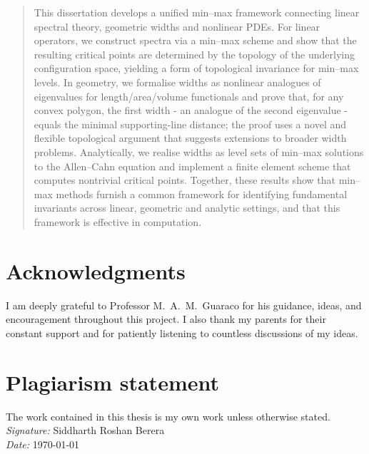 \documentclass[a4paper,11pt, twoside]{report}
\theoremstyle{definition}  %
\newcommand{\reportauthor}{Siddharth Roshan Berera} %
\begin{document}


\begin{abstract}
This dissertation develops a unified min--max framework connecting linear spectral theory, geometric widths and nonlinear PDEs. For linear operators, we construct spectra via a min--max scheme and show that the resulting critical points are determined by the topology of the underlying configuration space, yielding a form of topological invariance for min--max levels. In geometry, we formalise widths as nonlinear analogues of eigenvalues for length/area/volume functionals and prove that, for any convex polygon, the first width - an analogue of the second eigenvalue - equals the minimal supporting-line distance; the proof uses a novel and flexible topological argument that suggests extensions to broader width problems. Analytically, we realise widths as level sets of min--max solutions to the Allen--Cahn equation and implement a finite element scheme that computes nontrivial critical points. Together, these results show that min--max methods furnish a common framework for identifying fundamental invariants across linear, geometric and analytic settings, and that this framework is effective in computation.
\end{abstract}
 
\clearpage
\section*{Acknowledgments}
\noindent I am deeply grateful to Professor M.\ A.\ M.\ Guaraco for his guidance, ideas, and encouragement throughout this project. I also thank my parents for their constant support and for patiently listening to countless discussions of my ideas.
\clearpage

\clearpage
\section*{Plagiarism statement}
The work contained in this thesis is my own work unless otherwise stated. \\

\vspace{1em}
\noindent \textit{Signature:} \reportauthor \\
\textit{Date:} \today
\clearpage

\tableofcontents









\appendix





\end{document}
